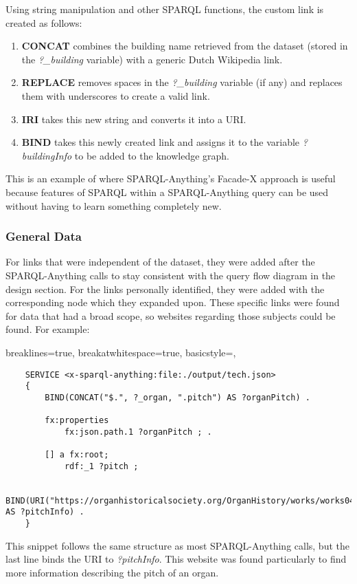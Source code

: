 Using string manipulation and other SPARQL functions, the custom link is created as follows:
\begin{enumerate}
    \item \textbf{CONCAT} combines the building name retrieved from the dataset (stored in the \textit{?\_building} variable) with a generic Dutch Wikipedia link.
    \item \textbf{REPLACE} removes spaces in the \textit{?\_building} variable (if any) and replaces them with underscores to create a valid link. 
    \item \textbf{IRI} takes this new string and converts it into a URI.
    \item \textbf{BIND} takes this newly created link and assigns it to the variable \textit{?buildingInfo} to be added to the knowledge graph. 
\end{enumerate}

This is an example of where SPARQL-Anything's Facade-X approach is useful because  features of SPARQL within a SPARQL-Anything query can be used without having to learn something completely new. 

\subsubsection{General Data}
\hspace*{0.5cm} For links that were independent of the dataset, they were added after the SPARQL-Anything calls to stay consistent with the query flow diagram in the design section. For the links personally identified, they were added with the corresponding node which they expanded upon. These specific links were found for data that had a broad scope, so websites regarding those subjects could be found. For example:

\lstset
{
    breaklines=true,
    breakatwhitespace=true,
    basicstyle=\ttfamily,
}
\begin{lstlisting}
    SERVICE <x-sparql-anything:file:./output/tech.json>
    {
        BIND(CONCAT("$.", ?_organ, ".pitch") AS ?organPitch) .
    
        fx:properties
            fx:json.path.1 ?organPitch ; .
    
        [] a fx:root; 
            rdf:_1 ?pitch ;
        
        BIND(URI("https://organhistoricalsociety.org/OrganHistory/works/works04.htm") AS ?pitchInfo) .
    } 
\end{lstlisting}

This snippet follows the same structure as most SPARQL-Anything calls, but the last line binds the URI to \textit{?pitchInfo}. This website was found particularly to find more information describing the pitch of an organ. 

